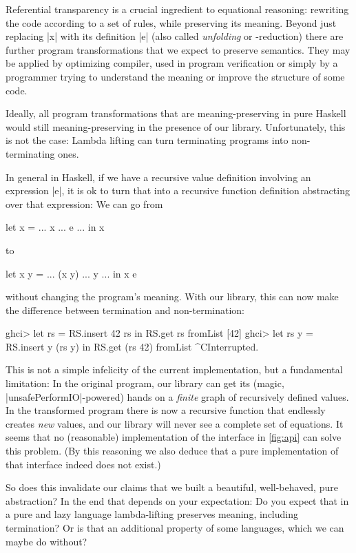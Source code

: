 \documentclass[manuscript,review,screen,acmsmall]{acmart}
\begin{document}
Referential transparency is a crucial ingredient to equational reasoning: rewriting the code according to a set of rules, while preserving its meaning. Beyond just replacing |x| with its definition |e| (also called \emph{unfolding} or \textdelta-reduction) there are further program transformations that we expect to preserve semantics. They may be applied by optimizing compiler, used in program verification or simply by a programmer trying to understand the meaning or improve the structure of some code.

Ideally, all program transformations that are meaning-preserving in pure Haskell would still meaning-preserving in the presence of our library. Unfortunately, this is not the case: Lambda lifting can turn terminating programs into non-terminating ones.

In general in Haskell, if we have a recursive value definition involving an expression |e|, it is ok to turn that into a recursive function definition abstracting over that expression: We can go from
\begin{code}
let x = ... x ... e ... in x
\end{code}
to
\begin{code}
let x y = ... (x y) ... y ... in x e
\end{code}
without changing the program's meaning. With our library, this can now make the difference between termination and non-termination:
\begin{code}
ghci> let rs = RS.insert 42 rs in RS.get rs
fromList [42]
ghci> let rs y = RS.insert y (rs y) in RS.get (rs 42)
fromList ^CInterrupted.
\end{code}

This is not a simple infelicity of the current implementation, but a fundamental limitation: In the original program, our library can get its (magic, |unsafePerformIO|-powered) hands on a \emph{finite} graph of recursively defined values. In the transformed program there is now a recursive function that endlessly creates \emph{new} values, and our library will never see a complete set of equations. It seems that no (reasonable) implementation of the interface in \cref{fig:api} can solve this problem. (By this reasoning we also deduce that a pure implementation of that interface indeed does not exist.)

So does this invalidate our claims that we built a beautiful, well-behaved, pure abstraction? In the end that depends on your expectation: Do you expect that in a pure and lazy language lambda-lifting preserves meaning, including termination? Or is that an additional property of some languages, which we can maybe do without?
\end{document}
